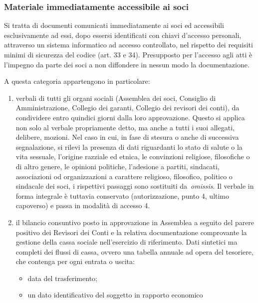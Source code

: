 \subsubsection{Materiale immediatamente accessibile ai soci}\label{materiale-comunicato-ai-soci}

Si tratta di documenti comunicati immediatamente ai soci ed accessibili
esclusivamente ad essi, dopo essersi identificati con chiavi d’accesso
personali, attraverso un sistema informatico ad accesso controllato, nel
rispetto dei requisiti minimi di sicurezza del codice (art. 33 e 34).
Presupposto per l’accesso agli atti è l’impegno da parte dei soci a non
diffondere in nessun modo la documentazione.  

A questa categoria appartengono in particolare:

\begin{enumerate}
    \item verbali di tutti gli organi sociali (Assemblea dei soci, Consiglio
        di Amministrazione, Collegio dei garanti, Collegio dei revisori dei
        conti), da condividere entro quindici giorni dalla loro
        approvazione. Questo si applica non solo al verbale propriamente
        detto, ma anche a tutti i suoi allegati, delibere, mozioni.
        Nel caso in cui, in fase di stesura o anche di successiva segnalazione, si
        rilevi la presenza di dati riguardanti lo stato di salute o la vita
        sessuale, l’origine razziale ed etnica, le convinzioni religiose,
        filosofiche o di altro genere, le opinioni politiche, l’adesione a partiti,
        sindacati, associazioni od organizzazioni a carattere religioso, filosofico,
        politico o sindacale dei soci, i rispettivi passaggi sono sostituiti
        da \emph{omissis}. Il verbale in forma integrale è tuttavia conservato
        (autorizzazione, punto 4, ultimo capoverso) e passa in modalità di accesso
        4.
    \item il bilancio consuntivo posto in approvazione in Assemblea a seguito
        del parere positivo dei Revisori dei Conti e la relativa
        documentazione comprovante la gestione della cassa sociale
        nell’esercizio di riferimento. 
        Dati sintetici ma completi dei flussi di cassa, ovvero una tabella
        annuale ad opera del tesoriere, che contenga per ogni entrata o uscita:
        \begin{itemize}
            \item data del trasferimento;
            \item un dato identificativo del soggetto in rapporto economico

\end{itemize}
\end{enumerate}
